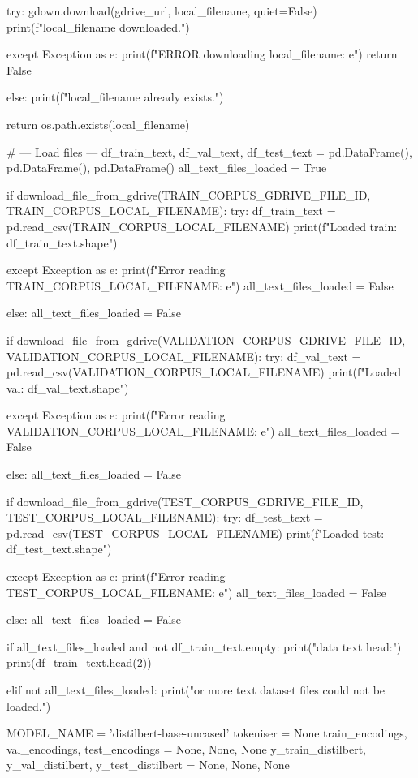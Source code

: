 \begin{ffcode}
        try:
            gdown.download(gdrive_url, local_filename, quiet=False)
            print(f"{local_filename} downloaded.")

        except Exception as e:
            print(f"ERROR downloading {local_filename}: {e}")
            return False

    else:
        print(f"{local_filename} already exists.")

    return os.path.exists(local_filename)

# --- Load files ---
df_train_text, df_val_text, df_test_text = pd.DataFrame(), pd.DataFrame(), pd.DataFrame()
all_text_files_loaded = True

if download_file_from_gdrive(TRAIN_CORPUS_GDRIVE_FILE_ID, TRAIN_CORPUS_LOCAL_FILENAME):
    try:
        df_train_text = pd.read_csv(TRAIN_CORPUS_LOCAL_FILENAME)
        print(f"Loaded train: {df_train_text.shape}")

    except Exception as e:
        print(f"Error reading {TRAIN_CORPUS_LOCAL_FILENAME}: {e}")
        all_text_files_loaded = False

else:
    all_text_files_loaded = False

if download_file_from_gdrive(VALIDATION_CORPUS_GDRIVE_FILE_ID, VALIDATION_CORPUS_LOCAL_FILENAME):
    try:
        df_val_text = pd.read_csv(VALIDATION_CORPUS_LOCAL_FILENAME)
        print(f"Loaded val: {df_val_text.shape}")

    except Exception as e:
        print(f"Error reading {VALIDATION_CORPUS_LOCAL_FILENAME}: {e}")
        all_text_files_loaded = False

else:
    all_text_files_loaded = False

if download_file_from_gdrive(TEST_CORPUS_GDRIVE_FILE_ID, TEST_CORPUS_LOCAL_FILENAME):
    try:
        df_test_text = pd.read_csv(TEST_CORPUS_LOCAL_FILENAME)
        print(f"Loaded test: {df_test_text.shape}")

    except Exception as e:
        print(f"Error reading {TEST_CORPUS_LOCAL_FILENAME}: {e}")
        all_text_files_loaded = False

else:
    all_text_files_loaded = False

if all_text_files_loaded and not df_train_text.empty:
    print("\nTrain data text head:")
    print(df_train_text.head(2))

elif not all_text_files_loaded:
    print("\nOne or more text dataset files could not be loaded.")

MODEL_NAME = 'distilbert-base-uncased'
tokeniser = None
train_encodings, val_encodings, test_encodings = None, None, None
y_train_distilbert, y_val_distilbert, y_test_distilbert = None, None, None


\end{ffcode}

